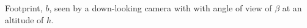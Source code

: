 \label{fig:fov} Footprint, $b$, seen by a down-looking camera with with angle of view of $\beta$ at an altitude of $h$.